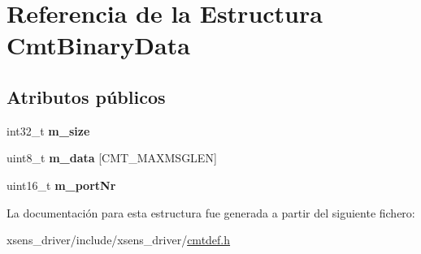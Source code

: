 \hypertarget{structCmtBinaryData}{\section{\-Referencia de la \-Estructura \-Cmt\-Binary\-Data}
\label{structCmtBinaryData}
}
\subsection*{\-Atributos públicos}
\begin{DoxyCompactItemize}
\item 
\hypertarget{structCmtBinaryData_a102c548cd4fe3f51391e39400e556dc6}{int32\-\_\-t {\bfseries m\-\_\-size}}\label{structCmtBinaryData_a102c548cd4fe3f51391e39400e556dc6}

\item 
\hypertarget{structCmtBinaryData_a486cf709c2db8534c6e29234fc263d11}{uint8\-\_\-t {\bfseries m\-\_\-data} \mbox{[}\-C\-M\-T\-\_\-\-M\-A\-X\-M\-S\-G\-L\-E\-N\mbox{]}}\label{structCmtBinaryData_a486cf709c2db8534c6e29234fc263d11}

\item 
\hypertarget{structCmtBinaryData_a5fadd9338e185406c2dfe83a6eccfdc6}{uint16\-\_\-t {\bfseries m\-\_\-port\-Nr}}\label{structCmtBinaryData_a5fadd9338e185406c2dfe83a6eccfdc6}

\end{DoxyCompactItemize}


\-La documentación para esta estructura fue generada a partir del siguiente fichero\-:\begin{DoxyCompactItemize}
\item 
xsens\-\_\-driver/include/xsens\-\_\-driver/\hyperlink{cmtdef_8h}{cmtdef.\-h}\end{DoxyCompactItemize}

